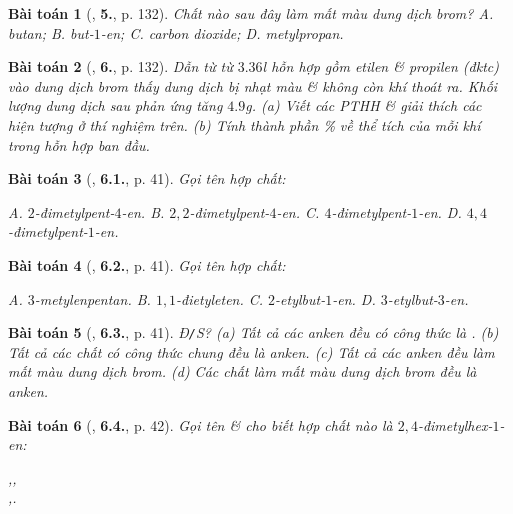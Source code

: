 \documentclass{article}
\numberwithin{equation}{section}
\newtheorem{baitoan}{Bài toán}[section]
\begin{document}
\begin{baitoan}[\cite{SGK_Hoa_Hoc_11_co_ban}, \textbf{5.}, p. 132]
	Chất nào sau đây làm mất màu dung dịch brom? {\sf A.} butan; {\sf B.} but-$1$-en; {\sf C.} carbon dioxide; {\sf D.} metylpropan.
\end{baitoan}

\begin{baitoan}[\cite{SGK_Hoa_Hoc_11_co_ban}, \textbf{6.}, p. 132]
	Dẫn từ từ $3.36$\emph{l} hỗn hợp gồm etilen \& propilen (đktc) vào dung dịch brom thấy dung dịch bị nhạt màu \& không còn khí thoát ra. Khối lượng dung dịch sau phản ứng tăng $4.9$\emph{g}. (a) Viết các PTHH \& giải thích các hiện tượng ở thí nghiệm trên. (b) Tính thành phần \% về thể tích của mỗi khí trong hỗn hợp ban đầu.
\end{baitoan}

\begin{baitoan}[\cite{SBT_Hoa_Hoc_11_co_ban}, \textbf{6.1.}, p. 41]
	Gọi tên hợp chất:
	\begin{center}
	\end{center}
	{\sf A.} $2$-đimetylpent-$4$-en. {\sf B.} $2,2$-đimetylpent-$4$-en. {\sf C.} $4$-đimetylpent-$1$-en. {\sf D.} $4,4$-đimetylpent-$1$-en.
\end{baitoan}

\begin{baitoan}[\cite{SBT_Hoa_Hoc_11_co_ban}, \textbf{6.2.}, p. 41]
	Gọi tên hợp chất:
	\begin{center}
	\end{center}
	{\sf A.} $3$-metylenpentan. {\sf B.} $1,1$-đietyleten. {\sf C.} $2$-etylbut-$1$-en. {\sf D.} $3$-etylbut-$3$-en.
\end{baitoan}

\begin{baitoan}[\cite{SBT_Hoa_Hoc_11_co_ban}, \textbf{6.3.}, p. 41]
	\emph{Đ\texttt{/}S?} (a) Tất cả các anken đều có công thức là \emph{}. (b) Tất cả các chất có công thức chung \emph{} đều là anken. (c) Tất cả các anken đều làm mất màu dung dịch brom. (d) Các chất làm mất màu dung dịch brom đều là anken.
\end{baitoan}

\begin{baitoan}[\cite{SBT_Hoa_Hoc_11_co_ban}, \textbf{6.4.}, p. 42]
	Gọi tên \& cho biết hợp chất nào là $2,4$-đimetylhex-$1$-en:
	\begin{center}
		,\hspace{1cm},\\,\hspace{1cm}.
	\end{center}
\end{baitoan}
\end{document}
